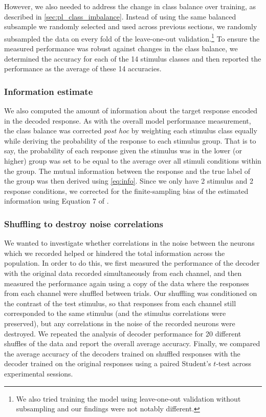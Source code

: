 However, we also needed to address the change in class balance over training, as described in \autoref{sec:pl_class_imbalance}.
Instead of using the same balanced subsample we randomly selected and used across previous sections, we randomly subsampled the data on every fold of the leave-one-out validation.\footnote{We also tried training the model using leave-one-out validation without subsampling and our findings were not notably different.}
To ensure the measured performance was robust against changes in the class balance, we determined the accuracy for each of the \num{14} stimulus classes and then reported the performance as the average of these \num{14} accuracies.


\subsubsection{Information estimate}
\label{sec:pl_decode_info}

We also computed the amount of information about the target response encoded in the decoded response.
As with the overall model performance measurement, the class balance was corrected \textit{post hoc} by weighting each stimulus class equally while deriving the probability of the response to each stimulus group.
That is to say, the probability of each response given the stimulus was in the lower (or higher) group was set to be equal to the average over all stimuli conditions within the group.
The mutual information between the response and the true label of the group was then derived using \autoref{eq:info}.
Since we only have \num{2} stimulus and \num{2} response conditions, we corrected for the finite-sampling bias of the estimated information using Equation 7 of \citet{Panzeri1996}.


\subsubsection{Shuffling to destroy noise correlations}
\label{sec:pl_dec_shuffle}

We wanted to investigate whether correlations in the noise between the neurons which we recorded helped or hindered the total information across the population.
In order to do this, we first measured the performance of the decoder with the original data recorded simultaneously from each channel, and then measured the performance again using a copy of the data where the responses from each channel were shuffled between trials.
Our shuffling was conditioned on the contrast of the test stimulus, so that responses from each channel still corresponded to the same stimulus (and the stimulus correlations were preserved), but any correlations in the noise of the recorded neurons were destroyed.
We repeated the analysis of decoder performance for \num{20} different shuffles of the data and report the overall average accuracy.
Finally, we compared the average accuracy of the decoders trained on shuffled responses with the decoder trained on the original responses using a paired Student's $t$-test across experimental sessions.

